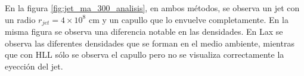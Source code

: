 \documentclass[12pt,a4paper]{book}
\begin{document}
En la figura \ref{fig:jet_ma_300_analisis}, en ambos métodos, se observa un jet con un radio $r_{jet} = 4 \times 10^{8} $ cm y un capullo que lo envuelve completamente. En la misma figura se observa una diferencia notable en las densidades. En Lax se observa las diferentes densidades que se forman en el medio ambiente, mientras que con HLL sólo se observa el capullo pero no se visualiza correctamente la eyección del jet.

\begin{figure} %
\centering
{}

\end{figure}
\end{document}
